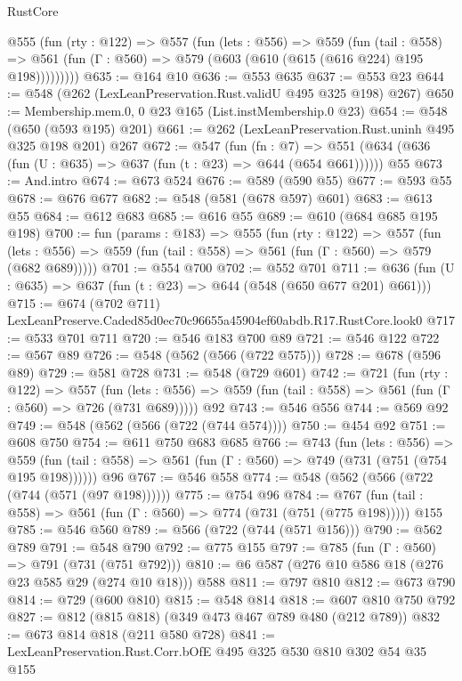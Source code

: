 \begin{lexlean}{RustCore}
\begin{coremodule}
      @555
        (fun (rty : @122) =>
        @557
          (fun (lets : @556) =>
          @559
            (fun (tail : @558) =>
            @561 (fun (Γ : @560) => @579 (@603 (@610 (@615 (@616 @224) @195 @198)))))))))
@635 := @164 @10
@636 := @553 @635
@637 := @553 @23
@644 := @548 (@262 (LexLeanPreservation.Rust.validU @495 @325 @198) @267)
@650 := Membership.mem.{0, 0} @23 @165 (List.instMembership.{0} @23)
@654 := @548 (@650 (@593 @195) @201)
@661 := @262 (LexLeanPreservation.Rust.uninh @495 @325 @198 @201) @267
@672 := @547
    (fun (fn : @7) =>
    @551 (@634 (@636 (fun (U : @635) => @637 (fun (t : @23) => @644 (@654 @661))))))
    @55
@673 := And.intro
@674 := @673 @524
@676 := @589 (@590 @55)
@677 := @593 @55
@678 := @676 @677
@682 := @548 (@581 (@678 @597) @601)
@683 := @613 @55
@684 := @612 @683
@685 := @616 @55
@689 := @610 (@684 @685 @195 @198)
@700 := fun (params : @183) =>
  @555
    (fun (rty : @122) =>
    @557
      (fun (lets : @556) => @559 (fun (tail : @558) => @561 (fun (Γ : @560) => @579 (@682 @689)))))
@701 := @554 @700
@702 := @552 @701
@711 := @636 (fun (U : @635) => @637 (fun (t : @23) => @644 (@548 (@650 @677 @201) @661)))
@715 := @674 (@702 @711) LexLeanPreserve.Caded85d0ec70c96655a45904ef60abdb.R17.RustCore.look0
@717 := @533 @701 @711
@720 := @546 @183 @700 @89
@721 := @546 @122
@722 := @567 @89
@726 := @548 (@562 (@566 (@722 @575)))
@728 := @678 (@596 @89)
@729 := @581 @728
@731 := @548 (@729 @601)
@742 := @721
    (fun (rty : @122) =>
    @557
      (fun (lets : @556) => @559 (fun (tail : @558) => @561 (fun (Γ : @560) => @726 (@731 @689)))))
    @92
@743 := @546 @556
@744 := @569 @92
@749 := @548 (@562 (@566 (@722 (@744 @574))))
@750 := @454 @92
@751 := @608 @750
@754 := @611 @750 @683 @685
@766 := @743
    (fun (lets : @556) =>
    @559 (fun (tail : @558) => @561 (fun (Γ : @560) => @749 (@731 (@751 (@754 @195 @198))))))
    @96
@767 := @546 @558
@774 := @548 (@562 (@566 (@722 (@744 (@571 (@97 @198))))))
@775 := @754 @96
@784 := @767 (fun (tail : @558) => @561 (fun (Γ : @560) => @774 (@731 (@751 (@775 @198))))) @155
@785 := @546 @560
@789 := @566 (@722 (@744 (@571 @156)))
@790 := @562 @789
@791 := @548 @790
@792 := @775 @155
@797 := @785 (fun (Γ : @560) => @791 (@731 (@751 @792)))
@810 := @6 @587 (@276 @10 @586 @18 (@276 @23 @585 @29 (@274 @10 @18))) @588
@811 := @797 @810
@812 := @673 @790
@814 := @729 (@600 @810)
@815 := @548 @814
@818 := @607 @810 @750 @792
@827 := @812 (@815 @818) (@349 @473 @467 @789 @480 (@212 @789))
@832 := @673 @814 @818 (@211 @580 @728)
@841 := LexLeanPreservation.Rust.Corr.bOfE @495 @325 @530 @810 @302 @54 @35 @155

\end{coremodule}
\end{lexlean}
